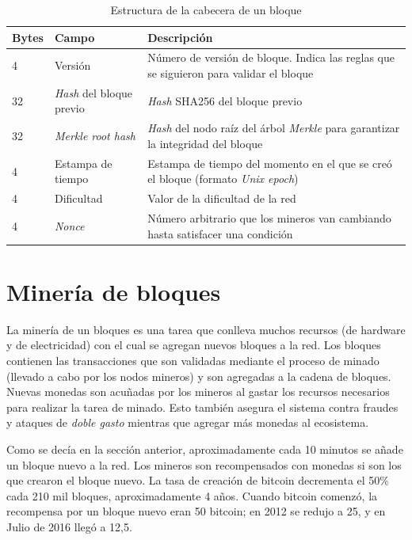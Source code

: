 \begin{table}[H]
    \begin{center}
        \begin{tabular}{ | l | l | p{9cm} | }
            \hline
            \textbf{Bytes} & \textbf{Campo} & \textbf{Descripción}  \\
            \hline
            4 & Versión & Número de versión de bloque. Indica las reglas que se siguieron para validar el bloque \\
            \hline
            32 & \emph{Hash} del bloque previo & \emph{Hash} SHA256 del bloque previo  \\
            \hline
            32 & \emph{Merkle root hash} & \emph{Hash} del nodo raíz del árbol \emph{Merkle} para garantizar la integridad del bloque \\
            \hline
            4 & Estampa de tiempo & Estampa de tiempo del momento en el que se creó el bloque (formato \emph{Unix epoch}) \\
            \hline
            4 & Dificultad & Valor de la dificultad de la red \\
            \hline
            4 & \emph{Nonce} & Número arbitrario que los mineros van cambiando hasta satisfacer una condición \\
            \hline
        \end{tabular}
        \caption*{Estructura de la cabecera de un bloque \autocite{MasteringBlockchainBlockHeaderStructure}}
    \end{center}
\end{table}


\section{Minería de bloques}

La minería de un bloques es una tarea que conlleva muchos recursos (de hardware y de electricidad) con el cual se agregan nuevos bloques a la red. Los bloques contienen las transacciones que son validadas mediante el proceso de minado (llevado a cabo por los nodos mineros) y son agregadas a la cadena de bloques. Nuevas monedas son acuñadas por los mineros al gastar los recursos necesarios para realizar la tarea de minado. Esto también asegura el sistema contra fraudes y ataques de \emph{doble gasto} mientras que agregar más monedas al ecosistema.

Como se decía en la sección anterior, aproximadamente cada 10 minutos se añade un bloque nuevo a la red. Los mineros son recompensados con monedas si son los que crearon el bloque nuevo. La tasa de creación de bitcoin decrementa el 50\% cada 210 mil bloques, aproximadamente 4 años. Cuando bitcoin comenzó, la recompensa por un bloque nuevo eran 50 bitcoin; en 2012 se redujo a 25, y en Julio de 2016 llegó a 12,5.

